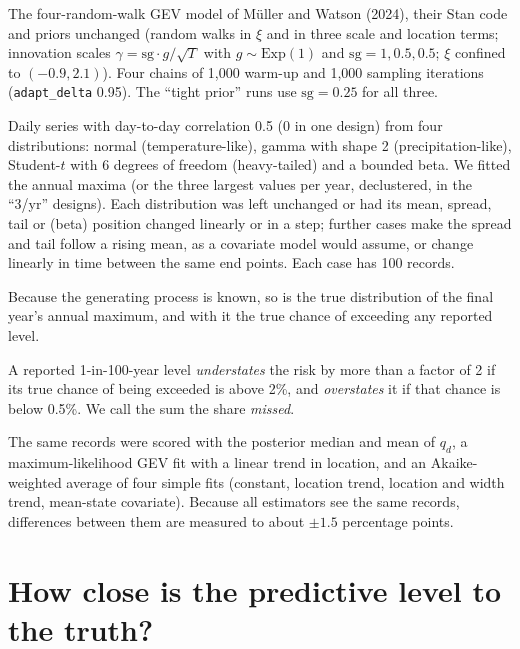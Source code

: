 \documentclass[11pt]{article}
\begin{document}
\begin{description}\setlength{\itemsep}{1pt}
\item[Model] The four-random-walk GEV model of M\"uller and Watson (2024), their Stan code and
  priors unchanged (random walks in $\xi$ and in three scale and location terms; innovation scales
  $\gamma=\mathrm{sg}\cdot g/\sqrt T$ with $g\sim\mathrm{Exp}(1)$ and $\mathrm{sg}=1, 0.5, 0.5$; $\xi$
  confined to $(-0.9, 2.1)$). Four chains of 1,000 warm-up and 1,000 sampling iterations
  (\texttt{adapt\_delta} 0.95). The ``tight prior'' runs use $\mathrm{sg}=0.25$ for all three.
\item[Data] Daily series with day-to-day correlation 0.5 (0 in one design) from four distributions:
  normal (temperature-like), gamma with shape 2 (precipitation-like), Student-$t$ with 6 degrees of
  freedom (heavy-tailed) and a bounded beta. We fitted the annual maxima (or the three largest
  values per year, declustered, in the ``3/yr'' designs). Each distribution was left unchanged or
  had its mean, spread, tail or (beta) position changed linearly or in a step; further cases make
  the spread and tail follow a rising mean, as a covariate model would assume, or change linearly
  in time between the same end points. Each case has 100 records.
\item[Truth] Because the generating process is known, so is the true distribution of the final
  year's annual maximum, and with it the true chance of exceeding any reported level.
\item[Score] A reported 1-in-100-year level \emph{understates} the risk by more than a factor of 2
  if its true chance of being exceeded is above 2\%, and \emph{overstates} it if that chance is
  below 0.5\%. We call the sum the share \emph{missed}.
\item[Comparison] The same records were scored with the posterior median and mean of $q_d$, a
  maximum-likelihood GEV fit with a linear trend in location, and an Akaike-weighted average of
  four simple fits (constant, location trend, location and width trend, mean-state covariate).
  Because all estimators see the same records, differences between them are measured to about
  $\pm1.5$ percentage points.
\end{description}

\section{How close is the predictive level to the truth?}\label{sec:close}
\end{document}
